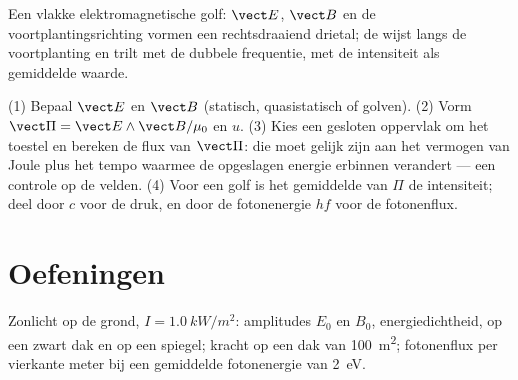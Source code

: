 \begin{omfigure}

{\small Een vlakke elektromagnetische golf: $\vect E$, $\vect B$ en de
voortplantingsrichting vormen een rechtsdraaiend drietal; de 
wijst langs de voortplanting en trilt met de dubbele frequentie, met de
intensiteit als gemiddelde waarde.}
\end{omfigure}

\begin{method}\label{met:b2:poynting-vector:method}
(1) Bepaal $\vect E$ en $\vect B$ (statisch, quasistatisch of golven). (2)
Vorm $\vect\Pi = \vect E\wedge\vect B/\mu_0$ en $u$. (3) Kies een gesloten
oppervlak om het toestel en bereken de flux van $\vect\Pi$: die moet gelijk
zijn aan het vermogen van Joule plus het tempo waarmee de opgeslagen energie
erbinnen verandert --- een controle op de velden. (4) Voor een golf is het
gemiddelde van $\Pi$ de intensiteit; deel door $c$ voor de druk, en door de
fotonenergie $hf$ voor de fotonenflux.
\end{method}

\section{Oefeningen}

\begin{exercise}[$\star$]\label{exo:b2:poynting-vector:1}
Zonlicht op de grond, $I = \qty{1.0}{kW/m^2}$: amplitudes $E_0$ en $B_0$,
energiedichtheid,  op een zwart dak en op een spiegel; kracht
op een dak van \qty{100}{m^2}; fotonenflux per vierkante meter bij een
gemiddelde fotonenergie van \qty{2}{eV}.
\end{exercise}

